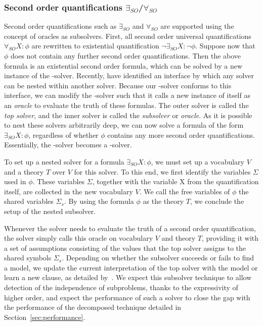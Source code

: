 \subsubsection{Second order quantifications $\exists_{SO}$/$\forall_{SO}$}
Second order quantifications such as $\exists_{SO}$ and $\forall_{SO}$ are supported using the concept of oracles as subsolvers.
First, all second order universal quantifications $\forall_{SO} X : \phi$ are rewritten to existential quantification $\neg \exists_{SO} X : \neg \phi$.
Suppose now that $\phi$ does not contain any further second order quantifications.
Then the above formula is an existential second order formula, which can be solved by a new instance of the \NP-solver.
Recently, \cite{AAAIW1612603} have identified an interface by which any solver can be nested within another solver.
Because our \NP-solver conforms to this interface, we can modify the \NP-solver such that it calls a new instance of itself as an \emph{oracle} to evaluate the truth of these formulas.
The outer solver is called the \emph{top solver}, and the inner solver is called the \emph{subsolver} or \emph{oracle}.
As it is possible to nest these solvers arbitrarily deep, we can now solve a formula of the form $\exists_{SO} X : \phi$, regardless of whether $\phi$ contains any more second order quantifications.
Essentially, the \NP-solver becomes a \QBF-solver.

To set up a nested solver for a formula $\exists_{SO} X : \phi$, we must set up a vocabulary $V$ and a theory $T$ over $V$ for this solver. 
To this end, we first identify the variables $\Sigma$ used in $\phi$.
These variables $\Sigma$, together with the variable X from the quantification itself, are collected in the new vocabulary $V$. 
We call the free variables of $\phi$ the shared variables $\Sigma_s$.
By using the formula $\phi$ as the theory $T$, we conclude the setup of the nested subsolver.

Whenever the solver needs to evaluate the truth of a second order quantification, the solver simply calls this oracle on vocabulary $V$ and theory $T$, providing it with a set of assumptions consisting of the values that the top solver assigns to the shared symbols $\Sigma_s$.
Depending on whether the subsolver succeeds or fails to find a model, we update the current interpretation of the top solver with the model or learn a new clause, as detailed by~\cite{AAAIW1612603}.
We expect this subsolver technique to allow detection of the independence of subproblems, thanks to the expressivity of higher order, and expect the performance of such a solver to close the gap with the performance of the decomposed technique detailed in Section~\ref{sec:performance}.

